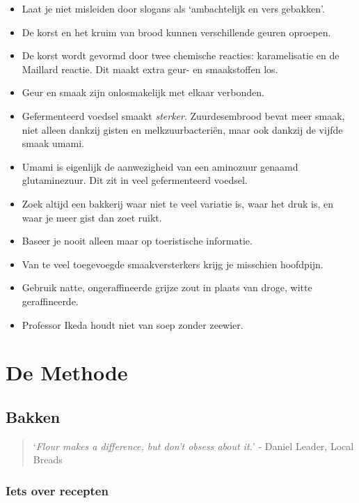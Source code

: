 \documentclass[
  11pt,
  dutch,
]{memoir}
\providecommand{\tightlist}{%
  \setlength{\itemsep}{0pt}\setlength{\parskip}{0pt}}
\begin{document}
\begin{itemize}
\tightlist
\item
  Laat je niet misleiden door slogans als `ambachtelijk en vers
  gebakken'.
\item
  De korst en het kruim van brood kunnen verschillende geuren oproepen.
\item
  De korst wordt gevormd door twee chemische reacties: karamelisatie en
  de Maillard reactie. Dit maakt extra geur- en smaakstoffen los.
\item
  Geur en smaak zijn onlosmakelijk met elkaar verbonden.
\item
  Gefermenteerd voedsel smaakt \emph{sterker}. Zuurdesembrood bevat meer
  smaak, niet alleen dankzij gisten en melkzuurbacteriën, maar ook
  dankzij de vijfde smaak umami.
\item
  Umami is eigenlijk de aanwezigheid van een aminozuur genaamd
  glutaminezuur. Dit zit in veel gefermenteerd voedsel.
\item
  Zoek altijd een bakkerij waar niet te veel variatie is, waar het druk
  is, en waar je meer gist dan zoet ruikt.
\item
  Baseer je nooit alleen maar op toeristische informatie.
\item
  Van te veel toegevoegde smaakversterkers krijg je misschien hoofdpijn.
\item
  Gebruik natte, ongeraffineerde grijze zout in plaats van droge, witte
  geraffineerde.
\item
  Professor Ikeda houdt niet van soep zonder zeewier.
\end{itemize}

\hypertarget{de-methode}{%
\part{De Methode}\label{de-methode}}

\label{bakken}

\hypertarget{bakken}{%
\chapter{Bakken}\label{bakken}}

\label{bakkenhf}

\begin{quote}
`\emph{Flour makes a difference, but don't obsess about it.}' - Daniel
Leader, Local Breads
\end{quote}

\hypertarget{iets-over-recepten}{%
\section{Iets over recepten}\label{iets-over-recepten}}
\end{document}
